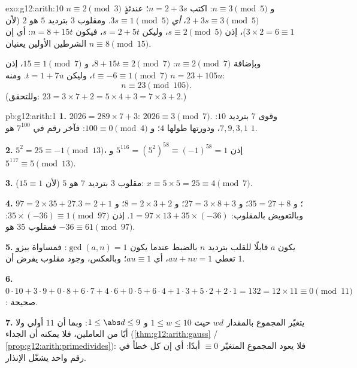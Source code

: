 \begin{solution}{exo:g12:arith:10}
$n \equiv 2 \pmod 3$ و $n \equiv 3 \pmod 5$: اكتب $n = 2 + 3s$؛ عندئذٍ
$2 + 3s \equiv 3 \pmod 5$، \emph{أي} $3s \equiv 1 \pmod 5$. ومقلوب
$3$ بترديد $5$ هو $2$ (لأن $3\times2 = 6 \equiv 1$)، إذن $s \equiv 2 \pmod 5$،
وليكن $s = 2 + 5t$، فيكون $n = 8 + 15t$: أي إن الشرطين الأولين يعنيان
$n \equiv 8 \pmod{15}$.

وبإضافة $n \equiv 2 \pmod 7$: $8 + 15t \equiv 2 \pmod 7$، و
$15 \equiv 1 \pmod 7$، إذن $t \equiv -6 \equiv 1 \pmod 7$، وليكن
$t = 1 + 7u$. ومنه $n = 23 + 105u$:
\[
n \equiv 23 \pmod{105}.
\]
(وللتحقق: $23 = 3\times7 + 2 = 5\times4 + 3 = 7\times3 + 2$.)
\end{solution}

\begin{solution}{pb:g12:arith:1}
\textbf{1.} $2026 = 289 \times 7 + 3$: $2026 \equiv 3
\pmod 7$. وقوى $7$ بترديد $10$: $7, 9, 3, 1$، ودورتها
طولها $4$؛ و $100 \equiv 0 \pmod 4$: فآخر رقم في
$7^{100}$ هو $1$.

\textbf{2.} $5^2 = 25 \equiv -1 \pmod{13}$، إذن
$5^{116} = \left(5^2\right)^{58} \equiv (-1)^{58} = 1$ و
$5^{117} \equiv 5 \pmod{13}$.

\textbf{3.} مقلوب $3$ بترديد $7$ هو $5$
(لأن $15 \equiv 1$): $x \equiv 5 \times 5 = 25 \equiv 4 \pmod 7$.

\textbf{4.} $97 = 2 \times 35 + 27$؛ و $35 = 27 + 8$؛
و $27 = 3 \times 8 + 3$؛ و $8 = 2 \times 3 + 2$؛ و $3 = 2 + 1$.
وبالتعويض بالمقلوب: $1 = 97 \times 13 + 35 \times (-36)$. إذن
$35 \times (-36) \equiv 1 \pmod{97}$: فمقلوب $35$ هو
$-36 \equiv 61 \pmod{97}$.

\textbf{5.} يكون $a$ قابلًا للقلب بترديد $n$ بالضبط عندما يكون
$\gcd(a, n) = 1$: فمساواة بيزو تعطي $au + nv = 1$، أي
$au \equiv 1$؛ وبالعكس، وجود مقلوب يفرض أن  
$1$.

\textbf{6.} $0{\cdot}10 + 3{\cdot}9 + 0{\cdot}8 + 6{\cdot}7 +
4{\cdot}6 + 0{\cdot}5 + 6{\cdot}4 + 1{\cdot}3 + 5{\cdot}2 +
2{\cdot}1 = 132 = 12 \times 11 \equiv 0 \pmod{11}$: صحيحة.

\textbf{7.} يتغيّر المجموع بالمقدار $wd$ حيث
$1 \leq w \leq 10$ و $1 \leq \abs d \leq 9$: وبما أن $11$
أولي ولا  أيًا من العاملين، فلا يمكنه أن  الجداء
(\cref{thm:g12:arith:gauss} / \cref{prop:g12:arith:primedivides}):
فلا يعود المجموع المتغيّر $\equiv 0$ أبدًا: أي إن كل خطأ في رقم
واحد يشغّل الإنذار.


\end{solution}
